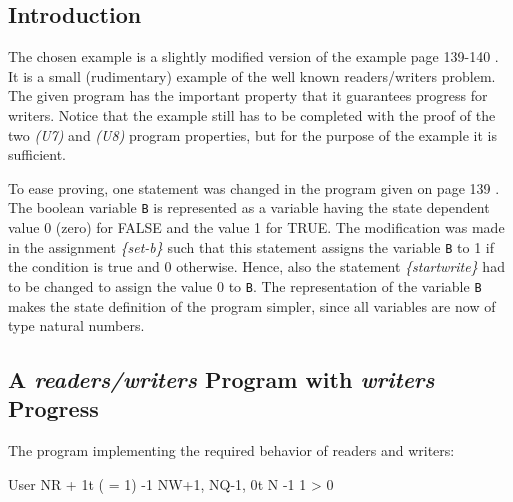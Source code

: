 \subsection{Introduction}

The chosen example is a slightly modified version of the example page 139-140
\cite{CM88}.  It is a small (rudimentary) example of the well known
readers/writers problem.  The given program has the important property that it
guarantees progress for writers.  Notice that the example still has to be
completed with the proof of the two {\it (U7)} and {\it (U8)} program
properties, but for the purpose of the example it is sufficient.

To ease proving, one statement was changed in the program given on page 139
\cite{CM88}.  The boolean variable {\tt B} is represented as a variable having
the state dependent value 0 (zero) for FALSE and the value 1 for TRUE.  The
modification was made in the assignment {\it \{set-b\}} such that this
statement assigns the variable {\tt B} to 1 if the condition is true and 0
otherwise.  Hence, also the statement {\it \{startwrite\}} had to be changed 
to assign the value 0 to {\tt B}.  The representation of the variable {\tt B}
makes the state definition of the program simpler, since all variables are now
of type natural numbers.

\subsection{A {\it readers/writers} Program with {\it writers} Progress}

The program implementing the required behavior of readers and writers:

\begin{unityProgram}{User}
\declare
\initial[initially]
\initial[always]
\assign
        {}{NR + 1}{t  \wedge \neg( = 1)}
        {}{-1}
        {}{NW+1, NQ-1, 0}{t \geq N \wedge {} }
        {}{-1}
        {}{1}{ > 0}
\end{unityProgram}

